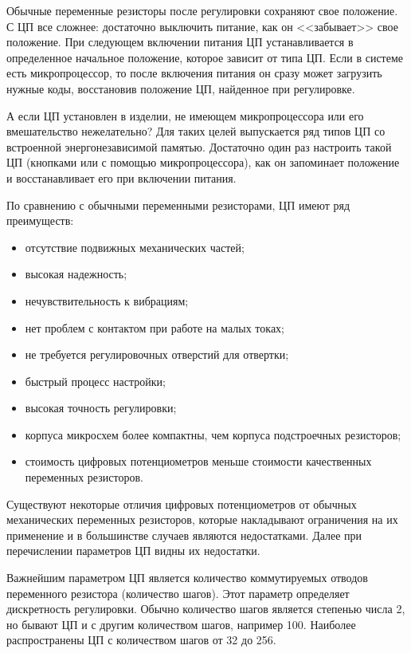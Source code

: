 Обычные переменные резисторы после регулировки сохраняют свое положение. С ЦП все сложнее: достаточно выключить питание, как он <<забывает>> свое положение. При следующем включении питания ЦП устанавливается в определенное начальное положение, которое зависит от типа ЦП. Если в системе есть микропроцессор, то после включения питания он сразу может загрузить нужные коды, восстановив положение ЦП, найденное при регулировке. 

А если ЦП установлен в изделии, не имеющем микропроцессора или его вмешательство нежелательно? Для таких целей выпускается ряд типов ЦП со встроенной энергонезависимой памятью. Достаточно один раз настроить такой ЦП (кнопками или с помощью микропроцессора), как он запоминает положение и восстанавливает его при включении питания.

По сравнению с обычными переменными резисторами, ЦП имеют ряд преимуществ:
\begin{itemize}
	\item отсутствие подвижных механических частей; 
	\item высокая надежность; 
	\item нечувствительность к вибрациям; 
	\item нет проблем с контактом при работе на малых токах; 
	\item не требуется регулировочных отверстий для отвертки; 
	\item быстрый процесс настройки; 
	\item высокая точность регулировки; 
	\item корпуса микросхем более компактны, чем корпуса подстроечных резисторов; 
	\item стоимость цифровых потенциометров меньше стоимости качественных переменных резисторов. 
\end{itemize}

Существуют некоторые отличия цифровых потенциометров от обычных механических переменных резисторов, которые накладывают ограничения на их применение и в большинстве случаев являются недостатками. Далее при перечислении параметров ЦП видны их недостатки.

Важнейшим параметром ЦП является количество коммутируемых отводов переменного резистора (количество шагов). Этот параметр определяет дискретность регулировки. Обычно количество шагов является степенью числа 2, но бывают ЦП и с другим количеством шагов, например 100. Наиболее распространены ЦП с количеством шагов от 32 до 256. 

